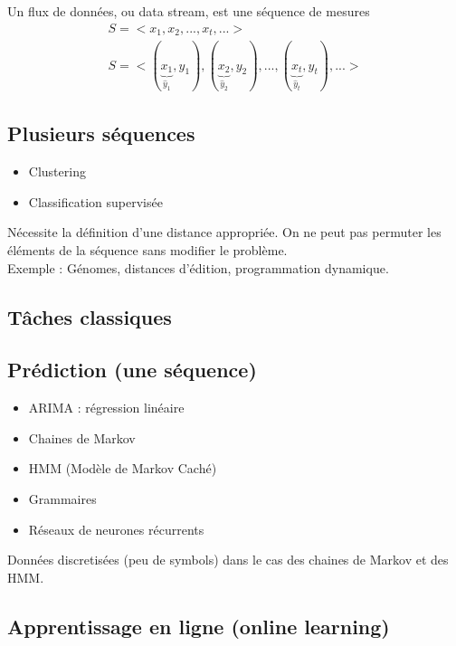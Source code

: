 \documentclass{article}
\begin{document}
Un flux de données, ou data stream, est une séquence de mesures 
\begin{align}
 S = <x_1, x_2, ..., x_t, ...> \\
 S = <(\underbrace{x_1}_{\hat{y}_1}, y_1),(\underbrace{x_2}_{\hat{y}_2}, y_2), ..., (\underbrace{x_t}_{\hat{y}_t}, y_t), ...>
\end{align}

\subsection{Plusieurs séquences}

\begin{itemize}
\item Clustering
\item Classification supervisée
\end{itemize}

Nécessite la définition d'une distance appropriée. On ne peut pas permuter les éléments de la séquence sans modifier le problème. \\
Exemple : Génomes, distances d'édition, programmation dynamique.

\subsection*{Tâches classiques}

\subsection{Prédiction (une séquence)}

\begin{itemize}
\item ARIMA : régression linéaire

 
\item Chaines de Markov
\item HMM (Modèle de Markov Caché)

\item Grammaires
\item Réseaux de neurones récurrents

\end{itemize}

Données discretisées (peu de symbols) dans le cas des chaines de Markov et des HMM.

\subsection{Apprentissage en ligne (online learning)}
\end{document}
